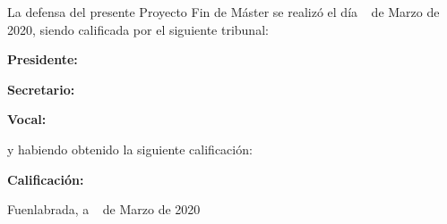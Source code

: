 \vspace{1cm}
La defensa del presente Proyecto Fin de Máster se realizó el día  \qquad$\;\,$ de Marzo de 2020, siendo calificada por el siguiente tribunal:


\vspace{0.5cm}
\textbf{Presidente:}

\vspace{1.2cm}
\textbf{Secretario:}

\vspace{1.2cm}
\textbf{Vocal:}

\vspace{1.2cm}
y habiendo obtenido la siguiente calificación:

\vspace{1cm}
\textbf{Calificación:}


\vspace{1cm}
\begin{flushright}
Fuenlabrada, a \qquad$\;\,$ de Marzo de 2020
\end{flushright}


